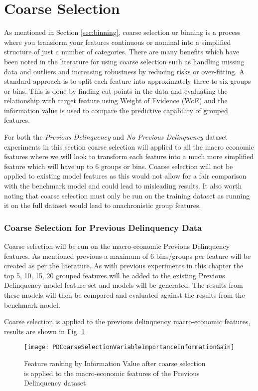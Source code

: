 \section{Coarse Selection}
As mentioned in Section \ref{sec:binning}, coarse selection or binning is a process where you transform your features continuous or nominal into a simplified structure of just a number of categories. There are many benefits which have been noted in the literature for using coarse selection such as handling missing data and outliers and increasing robustness by reducing risks or over-fitting. A standard approach is to split each feature into approximately three to six groups or bins. This is done by finding cut-points in the data and evaluating the relationship with target feature using Weight of Evidence (WoE) and the information value is used to compare the predictive capability of grouped features.

For both the \textit{Previous Delinquency} and \textit{No Previous Delinquency} dataset experiments in this section coarse selection will applied to all the macro economic features where we will look to transform each feature into a much more simplified feature which will have up to 6 groups or bins. Coarse selection will not be applied to existing model features as this would not allow for a fair comparison with the benchmark model and could lead to misleading results. It also worth noting that coarse selection must only be run on the training dataset as running it on the full dataset would lead to anachronistic group features.


\subsubsection{Coarse Selection for Previous Delinquency Data}
Coarse selection will be run on the macro-economic Previous Delinquency features. As mentioned previous a maximum of 6 bins/groups per feature will be created as per the literature. As with previous experiments in this chapter the top 5, 10, 15, 20 grouped features will be added to the existing Previous Delinquency model feature set and models will be generated. The results from these models will then be compared and evaluated against the results from the benchmark model.

Coarse selection is applied to the previous delinquency macro-economic features, results are shown in Fig. \ref{fig:PDCoarseSelectionVariableImportanceInformationGain}

\begin{figure}[H]
	\texttt{[image: PDCoarseSelectionVariableImportanceInformationGain]}
	\caption{Feature ranking by Information Value after coarse selection \\is applied to the macro-economic features of the Previous Delinquency dataset}
	\label{fig:PDCoarseSelectionVariableImportanceInformationGain}
\end{figure}

